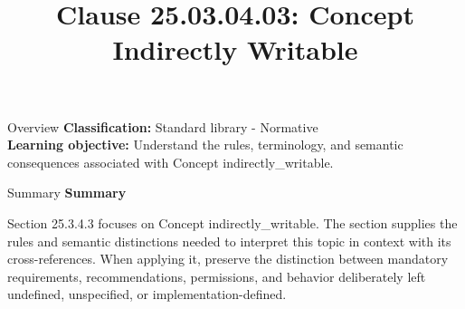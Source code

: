 \documentclass[10pt,letterpaper]{article}
\title{Clause 25.03.04.03: Concept Indirectly Writable}
\author{}
\date{}
\begin{document}
\maketitle
\begin{CornellOverviewBox}{Overview}
\textbf{Classification:} Standard library - Normative\\[2pt]
\textbf{Learning objective:} Understand the rules, terminology, and semantic consequences associated with Concept indirectly\_writable.
\end{CornellOverviewBox}\begin{CornellSummaryBox}{Summary}
{\sffamily\bfseries\color{Accent} Summary}\par\vspace{3pt}Section 25.3.4.3 focuses on Concept indirectly\_writable. The section supplies the rules and semantic distinctions needed to interpret this topic in context with its cross-references. When applying it, preserve the distinction between mandatory requirements, recommendations, permissions, and behavior deliberately left undefined, unspecified, or implementation-defined.
\end{CornellSummaryBox}
\end{document}
